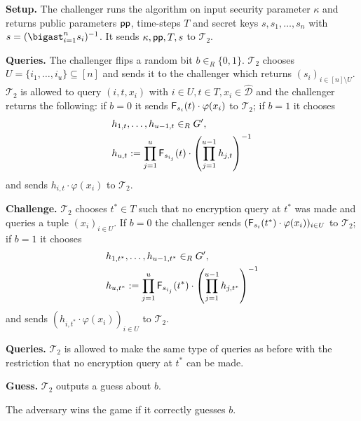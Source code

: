 \documentclass[10pt]{extarticle}
\begin{document}
\noindent\begin{description}
 \item\textbf{Setup.} The challenger runs the  algorithm on input security parameter $\kappa$ and returns public parameters $\mbox{\upshape\sffamily pp}$, time-steps $T$ and secret keys $s,s_1,\ldots,s_n$ with $s=(\bigast_{i=1}^n s_i)^{-1}$. It sends $\kappa, \mbox{\upshape\sffamily pp},T,s$ to $\mathcal{T}_2$.
\item\textbf{Queries.} The challenger flips a random bit $b\in_R\{0,1\}$. $\mathcal{T}_2$ chooses $U=\{i_1,\ldots,i_u\}\subseteq[n]$ and sends it to the challenger which returns $(s_i)_{i\in[n]\setminus U}$. $\mathcal{T}_2$ is allowed to query $(i,t,x_i)$ with $i\in U, t\in T, x_i\in\widehat{\mathcal{D}}$ and the challenger returns the following: if $b=0$ it sends $\text{\upshape\sffamily F}_{s_i}(t)\cdot \varphi(x_i)$ to $\mathcal{T}_2$; if $b=1$ it chooses 
\begin{align*} & h_{1,t},\ldots,h_{u-1,t}\in_R G^\prime,\\
 & h_{u,t}:= \prod_{j=1}^u \text{\upshape\sffamily F}_{s_{i_j}}(t)\cdot\left(\prod_{j=1}^{u-1}h_{j,t}\right)^{-1}
\end{align*}
and sends $h_{i,t}\cdot \varphi(x_i)$ to $\mathcal{T}_2$.
\item\textbf{Challenge.} $\mathcal{T}_2$ chooses $t^*\in T$ such that no encryption query at $t^*$ was made and queries a tuple $(x_i)_{i\in U}$. If $b=0$ the challenger sends $(\text{\upshape\sffamily F}_{s_i}(t^*)\cdot \varphi(x_i))_{i\in U}$ to $\mathcal{T}_2$; if $b=1$ it chooses 
\begin{align*} & h_{1,t^*},\ldots,h_{u-1,t^*}\in_R G^\prime,\\
 & h_{u,t^*}:= \prod_{j=1}^u \text{\upshape\sffamily F}_{s_{i_j}}(t^*)\cdot\left(\prod_{j=1}^{u-1}h_{j,t^*}\right)^{-1}
\end{align*}
and sends $(h_{i,t^*}\cdot \varphi(x_i))_{i\in U}$ to $\mathcal{T}_2$.
\item\textbf{Queries.} $\mathcal{T}_2$ is allowed to make the same type of queries as before with the restriction that no encryption query at $t^*$ can be made.
\item\textbf{Guess.} $\mathcal{T}_2$ outputs a guess about $b$.
\end{description}
The adversary wins the game if it correctly guesses $b$.\\
\end{document}
